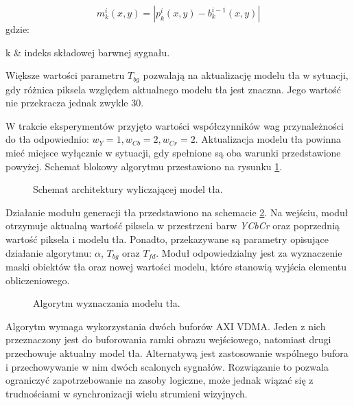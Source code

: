 \begin{enumerate}
	\begin{equation}
	\label{eq:background-model-background-mask-2}
	m^i_k(x,y) = | p^i_k(x,y) - b^{i-1}_k(x,y)|
	\end{equation}
	gdzie:
	\begin{conditions}
		k & indeks składowej barwnej sygnału. \\ 

	\end{conditions}
	
	Większe wartości parametru $T_{bg}$ pozwalają na aktualizację modelu tła w sytuacji, gdy różnica piksela względem aktualnego modelu tła jest znaczna. 
	Jego wartość nie przekracza jednak zwykle $30$.
\end{enumerate}

W trakcie eksperymentów przyjęto wartości współczynników wag przynależności do tła odpowiednio: $w_Y=1, w_{Cb} = 2, w_{Cr} = 2$.
Aktualizacja modelu tła powinna mieć miejsce wyłącznie w sytuacji, gdy spełnione są oba warunki przedstawione powyżej.
Schemat blokowy algorytmu przestawiono na rysunku \ref{fig:background-model}.

\begin{figure}[h]
	\centering
	\def\svgwidth{\textwidth}
	
	\caption{Schemat architektury wyliczającej model tła.}
	\label{fig:background-model}
\end{figure}


Działanie modułu generacji tła przedstawiono na schemacie \ref{fig:background-model-impl}. 
Na wejściu, moduł otrzymuje aktualną wartość piksela w przestrzeni barw \textit{YCbCr} oraz poprzednią wartość piksela i modelu tła. 
Ponadto, przekazywane są parametry opisujące działanie algorytmu: $\alpha$, $T_{bg}$ oraz $T_{fd}$. 
Moduł odpowiedzialny jest za wyznaczenie maski obiektów tła oraz nowej wartości modelu, które stanowią wyjścia elementu obliczeniowego.

\begin{figure}[h]
	\centering
	\def\svgwidth{\textwidth}
	
	\caption{Algorytm wyznaczania modelu tła.}
	\label{fig:background-model-impl}
\end{figure}

Algorytm wymaga wykorzystania dwóch buforów AXI VDMA. 
Jeden z nich przeznaczony jest do buforowania ramki obrazu wejściowego, natomiast drugi przechowuje aktualny model tła. 
Alternatywą jest zastosowanie wspólnego bufora i przechowywanie w nim dwóch scalonych sygnałów. 
Rozwiązanie to pozwala ograniczyć zapotrzebowanie na zasoby logiczne, może jednak wiązać się z trudnościami w synchronizacji wielu strumieni wizyjnych.

